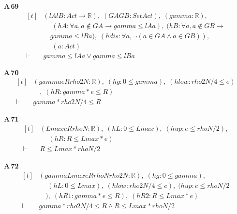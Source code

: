 \noindent\textbf{A\,69}\quad{}
{\footnotesize\[ \begin{aligned}[t]
&(\mathit{lA} \mathit{lB} : \mathit{Act} \to \mathbb{R} ),\; (\mathit{GA} \mathit{GB} : \mathit{Set} \mathit{Act}),\; (\mathit{gamma} : \mathbb{R} ),\\
&\quad \; (\mathit{hA} : \forall \mathit{a}, \mathit{a} \notin \mathit{GA} \to \mathit{gamma} \leq \mathit{lA} \mathit{a}),\; (\mathit{hB} : \forall \mathit{a}, \mathit{a} \notin \mathit{GB} \to\\
&\quad \mathit{gamma} \leq \mathit{lB} \mathit{a}),\; (\mathit{hdis} : \forall \mathit{a}, \neg (\mathit{a} \in \mathit{GA} \wedge \mathit{a} \in \mathit{GB})),\\
&\quad \; (\mathit{a} : \mathit{Act})\\
\vdash\;&\mathit{gamma} \leq \mathit{lA} \mathit{a} \vee \mathit{gamma} \leq \mathit{lB} \mathit{a}
\end{aligned} \]}

\noindent\textbf{A\,70}\quad{}
{\footnotesize\[ \begin{aligned}[t]
&(\mathit{gamma} \mathit{e} \mathit{R} \mathit{rho2N} : \mathbb{R} ),\; (\mathit{hg} : 0 \leq \mathit{gamma}),\; (\mathit{hlow} : \mathit{rho2N}/4 \leq \mathit{e})\\
&\quad ,\; (\mathit{hR} : \mathit{gamma} * \mathit{e} \leq \mathit{R})\\
\vdash\;&\mathit{gamma} * \mathit{rho2N} / 4 \leq \mathit{R}
\end{aligned} \]}

\noindent\textbf{A\,71}\quad{}
{\footnotesize\[ \begin{aligned}[t]
&(\mathit{Lmax} \mathit{e} \mathit{R} \mathit{rhoN} : \mathbb{R} ),\; (\mathit{hL} : 0 \leq \mathit{Lmax}),\; (\mathit{hup} : \mathit{e} \leq \mathit{rhoN}/2),\\
&\quad \; (\mathit{hR} : \mathit{R} \leq \mathit{Lmax} * \mathit{e})\\
\vdash\;&\mathit{R} \leq \mathit{Lmax} * \mathit{rhoN} / 2
\end{aligned} \]}

\noindent\textbf{A\,72}\quad{}
{\footnotesize\[ \begin{aligned}[t]
&(\mathit{gamma} \mathit{Lmax} \mathit{e} \mathit{R} \mathit{rhoN} \mathit{rho2N} : \mathbb{R} ),\; (\mathit{hg} : 0 \leq \mathit{gamma}),\\
&\quad \; (\mathit{hL} : 0 \leq \mathit{Lmax}),\; (\mathit{hlow} : \mathit{rho2N}/4 \leq \mathit{e}),\; (\mathit{hup} : \mathit{e} \leq \mathit{rhoN}/2\\
&\quad ),\; (\mathit{hR1} : \mathit{gamma} * \mathit{e} \leq \mathit{R}),\; (\mathit{hR2} : \mathit{R} \leq \mathit{Lmax} * \mathit{e})\\
\vdash\;&\mathit{gamma} * \mathit{rho2N} / 4 \leq \mathit{R} \wedge \mathit{R} \leq \mathit{Lmax} * \mathit{rhoN} / 2
\end{aligned} \]}

